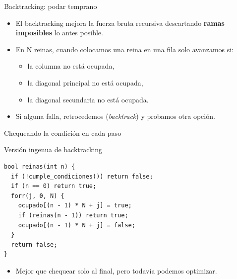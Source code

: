 \documentclass[aspectratio=169]{beamer}
\begin{document}
\begin{frame}{Backtracking: podar temprano}
  \begin{itemize}
    \item El backtracking mejora la fuerza bruta recursiva descartando \textbf{ramas imposibles} lo antes posible.
    \item En N reinas, cuando colocamos una reina en una fila solo avanzamos si:
      \begin{itemize}
        \item la columna no está ocupada,
        \item la diagonal principal no está ocupada,
        \item la diagonal secundaria no está ocupada.
      \end{itemize}
    \item Si alguna falla, retrocedemos (\textit{backtrack}) y probamos otra opción.
  \end{itemize}
\end{frame}

\begin{frame}[fragile]{Chequeando la condición en cada paso}
  \begin{block}{Versión ingenua de backtracking}
  \begin{lstlisting}[style=customc]
bool reinas(int n) {
  if (!cumple_condiciones()) return false;
  if (n == 0) return true;
  forr(j, 0, N) {
    ocupado[(n - 1) * N + j] = true;
    if (reinas(n - 1)) return true;
    ocupado[(n - 1) * N + j] = false;
  }
  return false;
}
  \end{lstlisting}
  \end{block}
  \begin{itemize}
    \item Mejor que chequear solo al final, pero todavía podemos optimizar.
  \end{itemize}
\end{frame}
\end{document}
